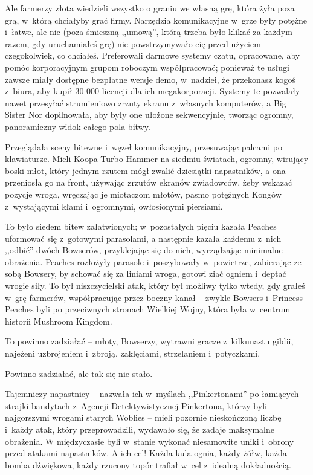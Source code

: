 \documentclass[oneside,polish,11pt,rmheadings]{mwbk}
\begin{document}
Ale farmerzy złota wiedzieli wszystko o graniu we własną grę, która żyła poza grą, w~którą chciałyby grać firmy. Narzędzia komunikacyjne w~grze były potężne i~łatwe, ale nic (poza śmieszną ,,umową'', którą trzeba było klikać za każdym razem, gdy uruchamiałeś grę) nie powstrzymywało cię przed użyciem czegokolwiek, co chciałeś. Preferowali darmowe systemy czatu, opracowane, aby pomóc korporacyjnym grupom roboczym współpracować; ponieważ te usługi zawsze miały dostępne bezpłatne wersje demo, w~nadziei, że przekonasz kogoś z~biura, aby kupił 30 000 licencji dla ich megakorporacji. Systemy te pozwalały nawet przesyłać strumieniowo zrzuty ekranu z~własnych komputerów, a Big Sister Nor dopilnowała, aby były one ułożone sekwencyjnie, tworząc ogromny, panoramiczny widok całego pola bitwy. 


Przeglądała sceny bitewne i~węzeł komunikacyjny, przesuwając palcami po klawiaturze. Mieli Koopa Turbo Hammer na siedmiu światach, ogromny, wirujący boski młot, który jednym rzutem mógł zwalić dziesiątki napastników, a ona przeniosła go na front, używając zrzutów ekranów zwiadowców, żeby wskazać pozycje wroga, wręczając je miotaczom młotów, pasmo potężnych Kongów z~wystającymi kłami i~ogromnymi, owłosionymi piersiami. 


To było siedem bitew załatwionych; w~pozostałych pięciu kazała Peaches uformować się z~gotowymi parasolami, a następnie kazała każdemu z~nich ,,odbić'' dwóch Bowserów, przyklejając się do nich, wyrządzając minimalne obrażenia. Peaches rozłożyły parasole i~poszybowały w~powietrze, zabierając ze sobą Bowsery, by schować się za liniami wroga, gotowi ziać ogniem i~deptać wrogie siły. To był niszczycielski atak, który był możliwy tylko wtedy, gdy grałeś w~grę farmerów, współpracując przez boczny kanał -- zwykle Bowsers i~Princess Peaches byli po przeciwnych stronach Wielkiej Wojny, która była w~centrum historii Mushroom Kingdom. 


To powinno zadziałać -- młoty, Bowserzy, wytrawni gracze z~kilkunastu gildii, najeżeni uzbrojeniem i~zbroją, zaklęciami, strzelaniem i~potyczkami. 


Powinno zadziałać, ale tak się nie stało. 


Tajemniczy napastnicy -- nazwała ich w~myślach ,,Pinkertonami'' po łamiących strajki bandytach z~Agencji Detektywistycznej Pinkertona, którzy byli najgorszymi wrogami starych Woblies -- mieli pozornie nieskończoną liczbę i~każdy atak, który przeprowadzili, wydawało się, że zadaje maksymalne obrażenia. W międzyczasie byli w~stanie wykonać niesamowite uniki i~obrony przed atakami napastników. A ich cel! Każda kula ognia, każdy żółw, każda bomba dźwiękowa, każdy rzucony topór trafiał w~cel z~idealną dokładnością. 
\end{document}
